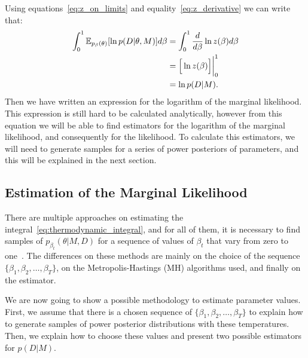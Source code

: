 Using equations~\ref{eq:z_on_limits} and equality~\ref{eq:z_derivative}
we can write that:
\begin{align}
    \int_0^1 \mathbb{E}_{p_\beta (\theta)} [\ln p(D|\theta, M)]d\beta 
    &= \int_0^1 \frac{d}{d\beta} \ln z(\beta) d\beta \notag \\
    &= \Big[\ln z(\beta)\Big]\bigg\rvert^1_0 \notag \\
    &= \ln p (D | M).
    \label{eq:thermodynamic_integral}
\end{align}
Then we have written an expression for the logarithm of the marginal
likelihood. This expression is still hard to be calculated analytically,
however from this equation we will be able to find estimators for
the logarithm of the marginal likelihood, and consequently for the
likelihood. To calculate this estimators, we will need to generate 
samples for a series of power posteriors of parameters, and this will
be explained in the next section.

\subsection{Estimation of the Marginal Likelihood}
There are multiple approaches on estimating the 
integral~\ref{eq:thermodynamic_integral}, and for all of them, it is 
necessary to find samples of $p_{\beta_t} (\theta | M, D)$ for a 
sequence of values of $\beta_t$ that vary from zero to one~\cite{Xura20, 
Vyshemirsky2007, Friel2008}. The differences on these methods are mainly 
on the choice of the sequence $\{\beta_1, \beta_2, \ldots, \beta_T\}$,
on the Metropolis-Hastings (MH) algorithms used, and finally on the 
estimator.

We are now going to show a possible methodology to estimate parameter 
values. First, we assume that there is a chosen sequence of 
$\{\beta_1, \beta_2, \ldots, \beta_T\}$ to explain how to generate 
samples of power posterior distributions with these temperatures. Then, 
we explain how to choose these values and present two possible 
estimators for $p (D | M)$.


